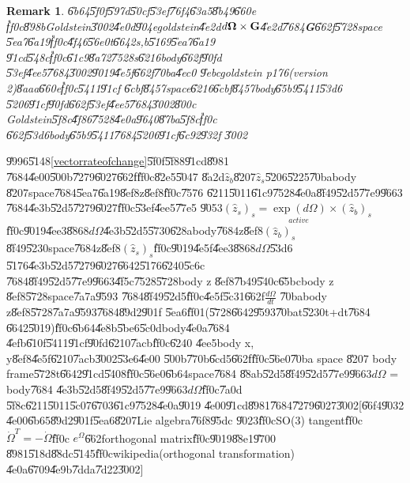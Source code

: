 \documentclass[12pt,a4paper]{article}
\newtheorem{remark}[theorem]{Remark}
\begin{document}
\begin{remark}
\U{6b64}\U{5f0f}\U{597d}\U{50cf}\U{53ef}\U{76f4}\U{63a5}\U{8b49}\U{660e}%
\U{ff0c}\U{898b}Goldstein\U{3002}\U{4e0d}\U{904e}goldstein\U{4e2d}$d\mathbf{%
\Omega }\times \mathbf{G}$\U{4e2d}\U{7684}\textbf{G}\U{662f}\U{5728}space%
\U{5ea7}\U{6a19}\U{ff0c}\U{4f46}\U{56e0}t\U{6642}s,b\U{5169}\U{5ea7}\U{6a19}%
\U{91cd}\U{548c}\U{ff0c}\U{61c9}\U{8a72}\U{7528}s\U{6216}body\U{662f}\U{90fd}%
\U{53ef}\U{4ee5}\U{7684}\U{3002}\U{9019}\U{4e5f}\U{662f}\U{70ba}\U{4ec0}%
\U{9ebc}goldstein p176(version 2)\U{8aaa}\U{660e}\U{ff0c}\U{5411}\U{91cf}%
\U{6cbf}\U{8457}space\U{6216}\U{6cbf}\U{8457}body\U{65b9}\U{5411}\U{53d6}%
\U{5206}\U{91cf}\U{90fd}\U{662f}\U{53ef}\U{4ee5}\U{7684}\U{3002}\U{800c}%
Goldstein\U{5f8c}\U{4f86}\U{7528}\U{4e0a}\U{9640}\U{87ba}\U{5f8c}\U{ff0c}%
\U{662f}\U{53d6}body\U{65b9}\U{5411}\U{7684}\U{5206}\U{91cf}\U{6c92}\U{932f}%
\U{3002}
\end{remark}

\U{9996}\U{5148}\ref{vectorrateofchange}\U{5f0f}\U{5f88}\U{91cd}\U{8981}%
\U{7684}\U{4e00}\U{500b}\U{7279}\U{6027}\U{662f}\U{ff0c}\U{82e5}\U{5047}%
\U{8a2d}$\hat{z}_{b}$\U{8207}$\hat{z}_{s}$\U{5206}\U{5225}\U{70ba}body%
\U{8207}space\U{7684}\U{5ea7}\U{6a19}\U{8ef8}z\U{8ef8}\U{ff0c}\U{7576}%
\U{6211}\U{5011}\U{61c9}\U{7528}\U{4e0a}\U{8f49}\U{52d5}\U{77e9}\U{9663}%
\U{7684}\U{4e3b}\U{52d5}\U{7279}\U{6027}\U{ff0c}\U{53ef}\U{4ee5}\U{77e5}%
\U{9053}$\left( \hat{z}_{s}\right) _{s}=\underset{active}{\exp (d\Omega )}%
\times \left( \hat{z}_{b}\right) _{s}$\U{ff0c}\U{9019}\U{4ee3}\U{8868}$%
d\Omega $\U{4e3b}\U{52d5}\U{5730}\U{628a}body\U{7684}z\U{8ef8}$\left( \hat{z}%
_{b}\right) _{s}$\U{8f49}\U{5230}space\U{7684}z\U{8ef8}$\left( \hat{z}%
_{s}\right) _{s}$\U{ff0c}\U{9019}\U{4e5f}\U{4ee3}\U{8868}$d\Omega $\U{53d6}%
\U{5176}\U{4e3b}\U{52d5}\U{7279}\U{6027}\U{6642}\U{5176}\U{6240}\U{5c6c}%
\U{7684}\U{8f49}\U{52d5}\U{77e9}\U{9663}\U{4f5c}\U{7528}\U{5728}body z%
\U{8ef8}\U{7b49}\U{540c}\U{65bc}body z \U{8ef8}\U{5728}space\U{7a7a}\U{9593}%
\U{7684}\U{8f49}\U{52d5}\U{ff0c}\U{4e5f}\U{5c31}\U{662f}$\frac{d\Omega }{dt}$%
\U{70ba}body z\U{8ef8}\U{5728}\U{7a7a}\U{9593}\U{7684}\U{89d2}\U{901f}%
\U{5ea6}\U{ff01}(\U{5728}\U{6642}\U{9593}\U{70ba}t\U{5230}t+dt\U{7684}%
\U{6642}\U{5019})\U{ff0c}\U{6b64}\U{4e8b}\U{5be6}\U{5c0d}body\U{4e0a}\U{7684}%
\U{4efb}\U{610f}\U{5411}\U{91cf}\U{90fd}\U{6210}\U{7acb}\U{ff0c}\U{6240}%
\U{4ee5}body x, y\U{8ef8}\U{4e5f}\U{6210}\U{7acb}\U{3002}\U{53e6}\U{4e00}%
\U{500b}\U{770b}\U{6cd5}\U{662f}\U{ff0c}\U{56e0}\U{70ba} space \U{8207} body
frame\U{5728}t\U{6642}\U{91cd}\U{5408}\U{ff0c}\U{56e0}\U{6b64}space\U{7684}%
\U{88ab}\U{52d5}\U{8f49}\U{52d5}\U{77e9}\U{9663}$d\Omega $ = body\U{7684}%
\U{4e3b}\U{52d5}\U{8f49}\U{52d5}\U{77e9}\U{9663}$d\Omega $\U{ff0c}\U{7a0d}%
\U{5f8c}\U{6211}\U{5011}\U{5c07}\U{6703}\U{61c9}\U{7528}\U{4e0a}\U{9019}%
\U{4e00}\U{91cd}\U{8981}\U{7684}\U{7279}\U{6027}\U{3002}[\U{66f4}\U{9032}%
\U{4e00}\U{6b65}\U{89d2}\U{901f}\U{5ea6}\U{8207}Lie algebra\U{76f8}\U{95dc}%
\U{9023}\U{ff0c}SO(3) tangent\U{ff0c}$\dot{\Omega}^{T}=-\dot{\Omega}$\U{ff0c}%
$e^{\Omega }$\U{662f}orthogonal matrix\U{ff0c}\U{9019}\U{88e1}\U{9700}%
\U{8981}\U{518d}\U{88dc}\U{5145}\U{ff0c}wikipedia(orthogonal transformation)%
\U{4e0a}\U{6709}\U{4e9b}\U{7dda}\U{7d22}\U{3002}]
\end{document}
